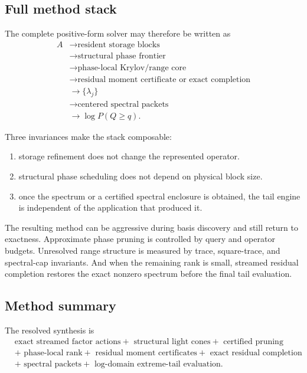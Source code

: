 \subsection{Full method stack}

The complete positive-form solver may therefore be written as
\[
\boxed{\begin{aligned}
A
&\longrightarrow \text{resident storage blocks}\\
&\longrightarrow \text{structural phase frontier}\\
&\longrightarrow \text{phase-local Krylov/range core}\\
&\longrightarrow \text{residual moment certificate or exact completion}\\
&\longrightarrow \{\lambda_j\}\\
&\longrightarrow \text{centered spectral packets}\\
&\longrightarrow \log P(Q\ge q).
\end{aligned}}
\]

Three invariances make the stack composable:
\begin{enumerate}
\item storage refinement does not change the represented operator.
\item structural phase scheduling does not depend on physical block size.
\item once the spectrum or a certified spectral enclosure is obtained, the
      tail engine is independent of the application that produced it.
\end{enumerate}

The resulting method can be aggressive during basis discovery and still return
to exactness.  Approximate phase pruning is controlled by query and operator
budgets. Unresolved range structure is measured by trace, square-trace, and
spectral-cap invariants. And when the remaining rank is small, streamed
residual completion restores the exact nonzero spectrum before the final tail
evaluation.

\subsection{Method summary}

The resolved synthesis is
\[
\boxed{\begin{aligned}
&\text{exact streamed factor actions}
+\text{ structural light cones}
+\text{ certified pruning}\\
&+\text{ phase-local rank}
+\text{ residual moment certificates}
+\text{ exact residual completion}\\
&+\text{ spectral packets}
+\text{ log-domain extreme-tail evaluation}.
\end{aligned}}
\]


